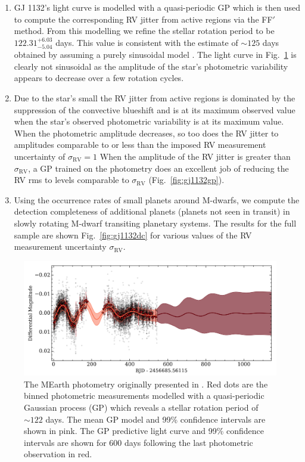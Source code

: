 \begin{enumerate}
\item GJ 1132's light curve is modelled with a quasi-periodic GP which is then used to 
compute the corresponding RV jitter from active regions via the FF$'$ method. From this 
modelling we refine the stellar rotation period to be $122.31^{+6.03}_{-5.04}$ days. This value 
is consistent with the estimate of $\sim 125$ days obtained by assuming a purely sinusoidal 
model \parencite[no reported measurement uncertainty;][]{berta15}. The light curve in 
Fig.~\ref{fig:gj1132lc} is clearly not sinusoidal as the amplitude of the star's photometric 
variability appears to decrease over a few rotation cycles.  
\item Due to the star's small \vsini{,} the RV jitter from active regions is dominated by 
the suppression 
of the convective blueshift and is at its maximum observed value when the star's observed 
photometric variability is at its maximum value. When the photometric amplitude decreases, 
so too does the RV jitter to amplitudes comparable to or 
less than the imposed RV measurement uncertainty of 
$\sigma_{\mathrm{RV}} = 1$  When the amplitude of the RV jitter 
is greater than $\sigma_{\mathrm{RV}}$, a GP 
trained on the photometry does an excellent job of reducing the RV rms to levels comparable to 
$\sigma_{\mathrm{RV}}$ (Fig.~\ref{fig:gj1132gp}).
\item Using the occurrence rates of small planets around M-dwarfs, we compute the detection 
completeness of additional planets (planets not seen in transit) 
in slowly rotating M-dwarf transiting planetary systems. The results 
for the full sample are shown Fig.~\ref{fig:gj1132dc} for various values of the RV measurement 
uncertainty $\sigma_{\mathrm{RV}}$. 
\end{enumerate}

\begin{figure}
\centering
\includegraphics[scale=.55]{figures/gpmodel_testdummy_gponly.png}
\caption{The MEarth photometry originally presented in \cite{berta15}.
Red dots are the binned photometric measurements modelled with a
quasi-periodic Gaussian process (GP) which reveals a stellar rotation period of
$\sim 122$ days. The mean GP model and 99\% confidence
intervals are shown in pink. The GP predictive light curve and 99\%
confidence intervals are shown for 600 days following the last photometric
observation in red.
\label{fig:gj1132lc}}
\end{figure}

